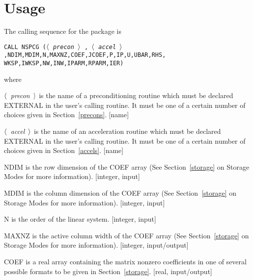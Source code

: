\newpage
\section{Usage}
\label{usage}
\indent
 
   The calling sequence for the package is
\bigskip
 
\noindent
{\tt CALL NSPCG ($\langle$~{\em precon}~$\rangle$ ,
    $\langle$~{\em accel}~$\rangle$ ,NDIM,MDIM,N,MAXNZ,COEF,JCOEF,P,IP,U,UBAR,RHS, \\
     \hspace*{2.5in} WKSP,IWKSP,NW,INW,IPARM,RPARM,IER) }
 
\bigskip
\noindent
where
\bigskip
\begin{list}{}{
               \leftmargin 1.00in \rightmargin 0.25in}
 \item[$\langle$~{\em precon}~$\rangle$ \hfill]
           is the name of a preconditioning routine which must
           be declared EXTERNAL in the user's calling routine.  It
           must be one of a certain number of choices given in
           Section~\ref{precons}. [name]
 
 \item[$\langle$~{\em accel}~$\rangle$ \hfill]
           is the name of an acceleration routine which must
           be declared EXTERNAL in the user's calling routine.  It
           must be one of a certain number of choices given in
           Section~\ref{accels}. [name]
 
 \item[NDIM \hfill]
           is the row dimension of the COEF array (See 
           Section~\ref{storage} on Storage Modes for more information).
           [integer, input]
 
 \item[MDIM \hfill]
           is the column dimension of the COEF array (See 
           Section~\ref{storage} on Storage Modes for more information).
           [integer, input]
 
 \item[N \hfill]
           is the order of the linear system.  [integer, input]
 
 \item[MAXNZ \hfill]
           is the active column width of the COEF array (See 
           Section~\ref{storage} on Storage Modes for more information).
           [integer, input/output]
 
 \item[COEF \hfill]
           is a real array containing the matrix nonzero coefficients
           in one of several possible formats to be given in
           Section~\ref{storage}. [real, input/output]
 

\end{list}
